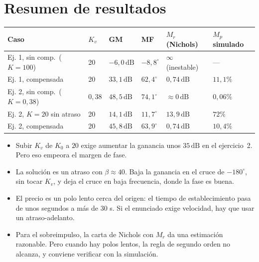 \documentclass[11pt,a4paper]{article}
\newcommand{\dB}{\,\mathrm{dB}}
\begin{document}
\section{Resumen de resultados}
\begin{center}
\small
\begin{tabular}{@{}llllll@{}}
\toprule
Caso & $K_v$ & GM & MF & $M_r$ (Nichols) & $M_p$ simulado\\
\midrule
Ej. 1, sin comp.\ ($K=100$) & 20 & $-6{,}0\dB$ & $-8{,}8^\circ$ & $\infty$ (inestable) & ---\\
Ej. 1, compensada & 20 & $33{,}1\dB$ & $62{,}4^\circ$ & $0{,}74\dB$ & $11{,}1\%$\\
Ej. 2, sin comp.\ ($K=0{,}38$) & $0{,}38$ & $48{,}5\dB$ & $74{,}1^\circ$ & $\approx0\dB$ & $0{,}06\%$\\
Ej. 2, $K=20$ sin atraso & 20 & $14{,}1\dB$ & $11{,}7^\circ$ & $13{,}9\dB$ & $72\%$\\
Ej. 2, compensada & 20 & $45{,}8\dB$ & $63{,}9^\circ$ & $0{,}74\dB$ & $10{,}4\%$\\
\bottomrule
\end{tabular}
\end{center}

\begin{idea}
\begin{itemize}
\item Subir $K_v$ de $K_0$ a $20$ exige aumentar la ganancia unos $35\dB$ en el ejercicio~2. Pero eso empeora el margen de fase.
\item La solución es un atraso con $\beta\approx40$. Baja la ganancia en el cruce de $-180^\circ$, sin tocar $K_v$, y deja el cruce en baja frecuencia, donde la fase es buena.
\item El precio es un polo lento cerca del origen: el tiempo de establecimiento pasa de unos segundos a más de 30 s. Si el enunciado exige velocidad, hay que usar un atraso-adelanto.
\item Para el sobreimpulso, la carta de Nichols con $M_r$ da una estimación razonable. Pero cuando hay polos lentos, la regla de segundo orden no alcanza, y conviene verificar con la simulación.
\end{itemize}
\end{idea}
\end{document}
